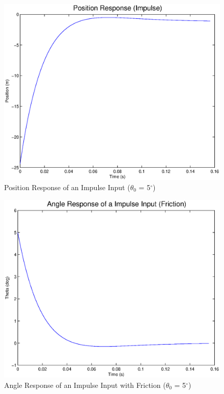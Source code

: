 \documentclass{article}
\begin{document}
\begin{figure}[!htb]
    \centering
    \includegraphics[scale=0.6]{5}
    \caption{Position Response of an Impulse Input ($\theta_0$ = 5$^{\circ}$)}
\end{figure} 

\begin{figure}[!htb]
    \centering
    \includegraphics[scale=0.6]{6}
    \caption{Angle Response of an Impulse Input with Friction ($\theta_0$ = 5$^{\circ}$)}
\end{figure} 
\end{document}
